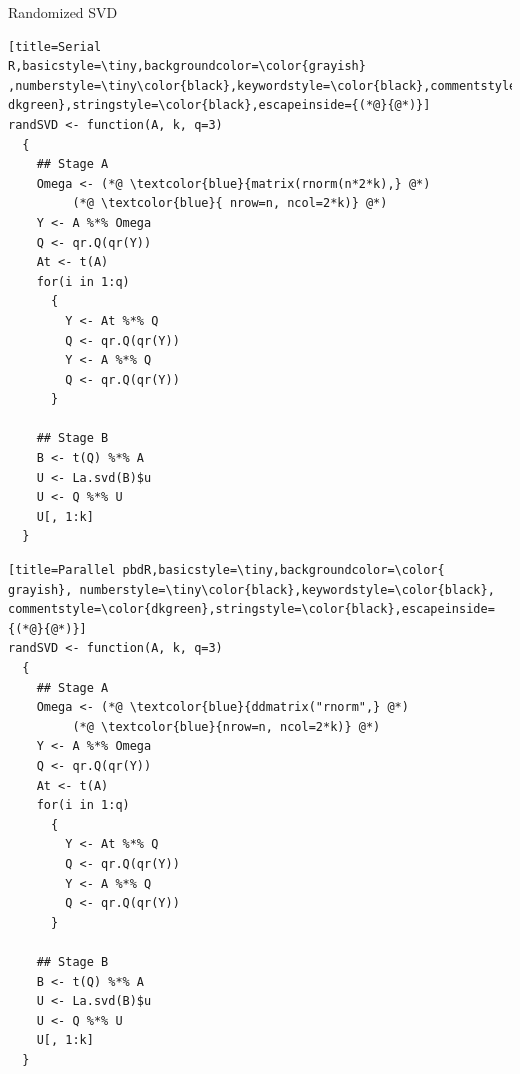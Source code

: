 \begin{frame}[fragile]
 \fontsize{8pt}{10}\selectfont
\begin{block}{Randomized SVD}
  \hfill
  \begin{minipage}{0.430\textwidth}
\begin{lstlisting}[title=Serial 
R,basicstyle=\tiny,backgroundcolor=\color{grayish} 
,numberstyle=\tiny\color{black},keywordstyle=\color{black},commentstyle=\color{ 
dkgreen},stringstyle=\color{black},escapeinside={(*@}{@*)}]
randSVD <- function(A, k, q=3)
  {
    ## Stage A
    Omega <- (*@ \textcolor{blue}{matrix(rnorm(n*2*k),} @*) 
         (*@ \textcolor{blue}{ nrow=n, ncol=2*k)} @*)
    Y <- A %*% Omega
    Q <- qr.Q(qr(Y))
    At <- t(A)
    for(i in 1:q)
      {
        Y <- At %*% Q
        Q <- qr.Q(qr(Y))
        Y <- A %*% Q
        Q <- qr.Q(qr(Y))
      }
    
    ## Stage B
    B <- t(Q) %*% A
    U <- La.svd(B)$u
    U <- Q %*% U
    U[, 1:k]
  }
\end{lstlisting} %
  \end{minipage}
  \hfill
  \begin{minipage}{0.430\textwidth}
\begin{lstlisting}[title=Parallel pbdR,basicstyle=\tiny,backgroundcolor=\color{
grayish}, numberstyle=\tiny\color{black},keywordstyle=\color{black},
commentstyle=\color{dkgreen},stringstyle=\color{black},escapeinside={(*@}{@*)}]
randSVD <- function(A, k, q=3)
  {
    ## Stage A
    Omega <- (*@ \textcolor{blue}{ddmatrix("rnorm",} @*)
         (*@ \textcolor{blue}{nrow=n, ncol=2*k)} @*)
    Y <- A %*% Omega
    Q <- qr.Q(qr(Y))
    At <- t(A)      
    for(i in 1:q)
      {
        Y <- At %*% Q   
        Q <- qr.Q(qr(Y))
        Y <- A %*% Q    
        Q <- qr.Q(qr(Y))
      }
    
    ## Stage B
    B <- t(Q) %*% A     
    U <- La.svd(B)$u 
    U <- Q %*% U     
    U[, 1:k]
  }
\end{lstlisting}  %
  \end{minipage}
\hfill
\end{block}
\end{frame}

